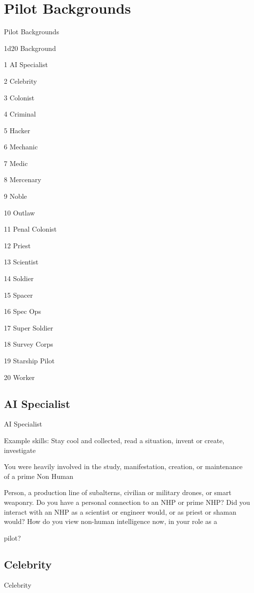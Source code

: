 \chapter{Pilot Backgrounds}


                                Pilot Backgrounds

 1d20       Background

  1        AI Specialist

  2         Celebrity

  3         Colonist

  4         Criminal

  5         Hacker

  6         Mechanic

  7         Medic

  8         Mercenary

  9         Noble

  10       Outlaw

  11        Penal Colonist

  12        Priest

  13       Scientist

  14       Soldier

  15       Spacer

  16       Spec Ops

  17       Super Soldier

  18       Survey Corps

  19       Starship Pilot

  20       Worker
\section{AI Specialist}
                                               AI Specialist

Example skills: Stay cool and collected, read a situation, invent or create, investigate

You were heavily involved in the study, manifestation, creation, or maintenance of a prime Non Human

Person, a production line of subalterns, civilian or military drones, or smart weaponry. Do you have a
personal connection to an NHP or prime NHP? Did you interact with an NHP as a scientist or engineer
would, or as priest or shaman would? How do you view non-human intelligence now, in your role as a

pilot?




\section{Celebrity}
                                                    Celebrity

